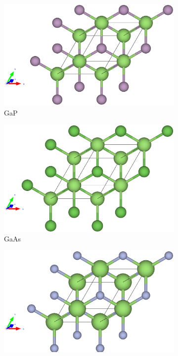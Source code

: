 \begin{figure}[htb]
\medskip
\begin{subfigure}{0.3\textwidth}
  \includegraphics[width=\linewidth]{images/gap_st_3d.eps}
  \caption{GaP}
\end{subfigure}\hfil %
\begin{subfigure}{0.3\textwidth}
  \includegraphics[width=\linewidth]{images/gaas_st_3d.eps}
  \caption{GaAs}
\end{subfigure}\hfil %
\begin{subfigure}{0.3\textwidth}
  \includegraphics[width=\linewidth]{images/gan_st_3d.eps}

\end{subfigure}
\end{figure}
